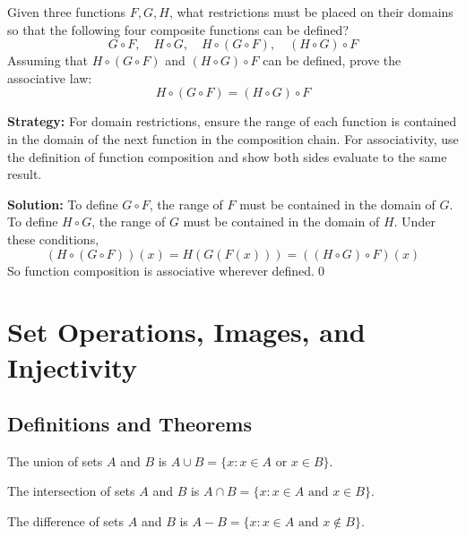 \begin{problembox}
Given three functions \( F, G, H \), what restrictions must be placed on their domains so that the following four composite functions can be defined?
\[
G \circ F, \quad H \circ G, \quad H \circ (G \circ F), \quad (H \circ G) \circ F
\]
Assuming that \( H \circ (G \circ F) \) and \( (H \circ G) \circ F \) can be defined, prove the associative law:
\[
H \circ (G \circ F) = (H \circ G) \circ F
\]
\end{problembox}

\noindent\textbf{Strategy:} For domain restrictions, ensure the range of each function is contained in the domain of the next function in the composition chain. For associativity, use the definition of function composition and show both sides evaluate to the same result.

\bigskip\noindent\textbf{Solution:}  
To define \( G \circ F \), the range of \( F \) must be contained in the domain of \( G \).  
To define \( H \circ G \), the range of \( G \) must be contained in the domain of \( H \).  
Under these conditions,  
\[
(H \circ (G \circ F))(x) = H(G(F(x))) = ((H \circ G) \circ F)(x)
\]  
So function composition is associative wherever defined.\qed

\section{Set Operations, Images, and Injectivity}

\subsection*{Definitions and Theorems}

\begin{definition}[Union]
The union of sets $A$ and $B$ is $A \cup B = \{x : x \in A \text{ or } x \in B\}$.
\end{definition}

\begin{definition}[Intersection]
The intersection of sets $A$ and $B$ is $A \cap B = \{x : x \in A \text{ and } x \in B\}$.
\end{definition}

\begin{definition}
The difference of sets $A$ and $B$ is $A - B = \{x : x \in A \text{ and } x \notin B\}$.
\end{definition}


